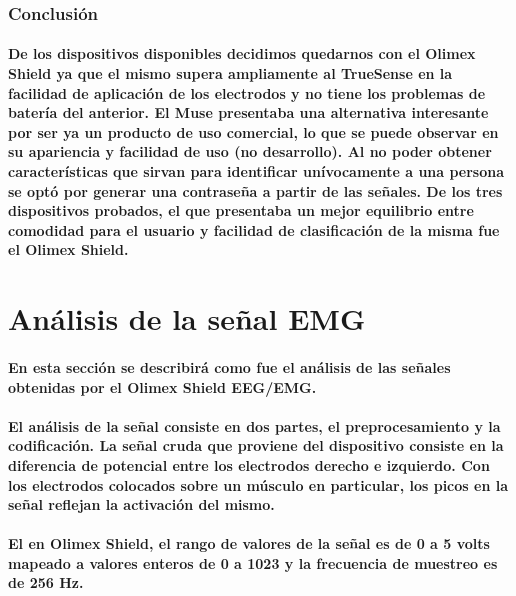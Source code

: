 \documentclass{article}
\begin{document}
\subsubsection{Conclusión}
\paragraph{
De los dispositivos disponibles decidimos quedarnos con el Olimex Shield ya que el mismo supera ampliamente al TrueSense en la facilidad de aplicación de los electrodos y no tiene los problemas de batería del anterior. El Muse presentaba una alternativa interesante por ser ya un producto de uso comercial, lo que se puede observar en su apariencia y facilidad de uso (no desarrollo). Al no poder obtener características que sirvan para identificar unívocamente a una persona se optó por generar una contraseña a partir de las señales. De los tres dispositivos probados, el que presentaba un mejor equilibrio entre comodidad para el usuario y facilidad de clasificación de la misma fue el Olimex Shield.
}

\section{Análisis de la señal EMG}
\paragraph{
En esta sección se describirá como fue el análisis de las señales obtenidas por el Olimex Shield EEG/EMG.
}
\paragraph{
El análisis de la señal consiste en dos partes, el preprocesamiento y la codificación. La señal cruda que proviene del dispositivo consiste en la diferencia de potencial entre los electrodos derecho e izquierdo. Con los electrodos colocados sobre un músculo en particular, los picos en la señal reflejan la activación del mismo.
}

\paragraph{
El en Olimex Shield, el rango de valores de la señal es de 0 a 5 volts mapeado a valores enteros de 0 a 1023 y la frecuencia de muestreo es de 256 Hz.
}
\end{document}
